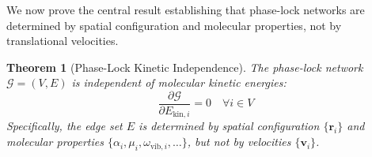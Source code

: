 \documentclass[12pt,a4paper]{article}
\newtheorem{theorem}{Theorem}[section]
\theoremstyle{definition}
\theoremstyle{remark}
\newcommand{\phaselockgraph}{\mathcal{G}}
\begin{document}
We now prove the central result establishing that phase-lock networks are determined by spatial configuration and molecular properties, not by translational velocities.

\begin{theorem}[Phase-Lock Kinetic Independence]
\label{thm:kinetic_independence}
The phase-lock network $\phaselockgraph = (V, E)$ is independent of molecular kinetic energies:
\begin{equation}
\frac{\partial \phaselockgraph}{\partial E_{\text{kin},i}} = 0 \quad \forall i \in V
\label{eq:network_kinetic_independence}
\end{equation}
Specifically, the edge set $E$ is determined by spatial configuration $\{\mathbf{r}_i\}$ and molecular properties $\{\alpha_i, \mu_i, \omega_{\text{vib},i}, \ldots\}$, but not by velocities $\{\mathbf{v}_i\}$.
\end{theorem}
\end{document}

